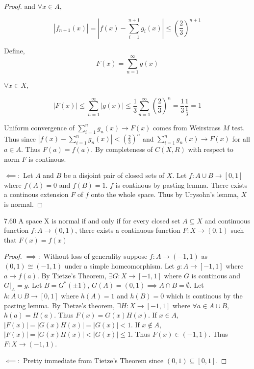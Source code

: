 \documentclass{article}
\newcommand*{\subeq}{\subseteq}
\newcommand*{\empset}{\emptyset}
\newcommand{\abs}[1]{\left\lvert #1\right\rvert}
\begin{document}
\begin{proof}
    and $\forall x \in A$, 
    
    
    \[\abs{f_{n + 1}(x)} = \abs{f(x) - \sum_{i = 1}^{n + 1}g_i(x)} \leq \left(\frac{2}{3}\right)^{n + 1}\]


    Define, \[F(x) = \sum_{n = 1}^{\infty} g(x)\]

    $\forall x \in X$, 
    
    \[
    \abs{F(x)} \leq \sum_{n = 1}^{\infty} \abs{g(x)} \leq \frac{1}{3} \sum_{n = 1}^{\infty}\left(\frac{2}{3}\right)^n = \frac{1}{3} \frac{1}{\frac{1}{3}} = 1
    \] 

    Uniform convergence of $\sum_{i = 1}^{n} g_n(x) \to F(x)$ comes from Weirstrass $M$ test. Thus since $\abs{f(x) - \sum_{i = 1}^{n} g_n(x)} < (\frac{2}{3})^n$ and $\sum_{i = 1}^{n} g_n(x) \to F(x)$ for all $a \in A$. Thus $F(a) = f(a)$. By completeness of $C(X, R)$ with respect to norm $F$ is continous.   
    
    $\impliedby: $ Let $A$ and $B$ be a disjoint pair of closed sets of $X$. Let $f: A \cup B \to [0, 1]$ where $f(A) = 0$ and $f(B) = 1$. $f$ is continous by pasting lemma. There exists a continous extension $F$ of $f$ onto the whole space. Thus by Urysohn's lemma, $X$ is normal.             
\end{proof}

\bigskip

\begin{claim}{7.60}\label{Claim 7.60.}
    A space X is normal if and only if for every closed set $A \subeq X$ and continuous function $f: A \to (0, 1)$, there exists a continuous function $F: X \to (0, 1)$ such that $F(x) = f(x)$   
\end{claim}
\begin{proof}
    $\implies: $ Without loss of generality suppose $f: A \to (-1, 1)$ as $(0, 1) \cong (-1, 1)$ under a simple homeomorphism. Let $g: A \to [-1, 1]$ where $a \to f(a)$. By Tietze's Theorem, $\exists G: X \to [-1, 1]$ where $G$ is continous and $G|_{A} = g$. Let $B = G^*(\pm 1)$, $G(A) = (0, 1) \implies A \cap B = \empset$. Let $h: A \cup B \to [0, 1]$ where $h(A) = 1$ and $h(B) = 0$ which is continous by the pasting lemma. By Tietze's theorem, $\exists H: X \to [-1, 1]$ where $\forall a \in A \cup B$, $h(a) = H(a)$. Thus $F(x) = G(x)H(x)$. If $x \in A$, $\abs{F(x)} = \abs{G(x) H(x)} = \abs{G(x)} < 1$. If $x \not \in A$, $\abs{F(x)} = \abs{G(x)H(x)} < \abs{G(x)}\leq 1$. Thus $F(x) \in (-1, 1)$. Thus $F: X \to (-1, 1)$.
    
    $\impliedby:$ Pretty immediate from Tietze's Theorem since $(0, 1)\subeq [0, 1]$.             
\end{proof}
\end{document}

